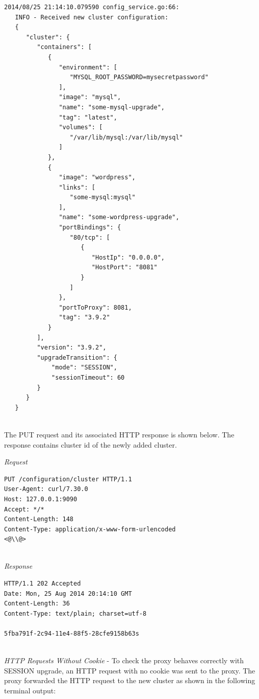 \documentclass[a4paper,11pt,twoside]{report}
\begin{document}
\begin{lstlisting}[language=terminal] 
2014/08/25 21:14:10.079590 config_service.go:66:     
   INFO - Received new cluster configuration:
   {
      "cluster": {
         "containers": [
            {
               "environment": [
                  "MYSQL_ROOT_PASSWORD=mysecretpassword"
               ],
               "image": "mysql",
               "name": "some-mysql-upgrade",
               "tag": "latest",
               "volumes": [
                  "/var/lib/mysql:/var/lib/mysql"
               ]
            },
            {
               "image": "wordpress",
               "links": [
                  "some-mysql:mysql"
               ],
               "name": "some-wordpress-upgrade",
               "portBindings": {
                  "80/tcp": [
                     {
                        "HostIp": "0.0.0.0",
                        "HostPort": "8081"
                     }
                  ]
               },
               "portToProxy": 8081,
               "tag": "3.9.2"
            }
         ],
         "version": "3.9.2",
         "upgradeTransition": {
             "mode": "SESSION",
             "sessionTimeout": 60
         }
      }
   }
\end{lstlisting}   

\noindent\\
The PUT request and its associated HTTP response is shown below. The response contains cluster id of the newly added cluster.\smallskip 

\noindent
\textit{Request}
\begin{lstlisting}[language=terminal]
PUT /configuration/cluster HTTP/1.1
User-Agent: curl/7.30.0
Host: 127.0.0.1:9090
Accept: */*
Content-Length: 148
Content-Type: application/x-www-form-urlencoded
<@\\@>
\end{lstlisting}

\noindent\\
\textit{Response}
\begin{lstlisting}[language=terminal]
HTTP/1.1 202 Accepted
Date: Mon, 25 Aug 2014 20:14:10 GMT
Content-Length: 36
Content-Type: text/plain; charset=utf-8

5fba791f-2c94-11e4-88f5-28cfe9158b63s
\end{lstlisting}  

\noindent\\
\textit{HTTP Requests Without Cookie} - To check the proxy behaves correctly with SESSION upgrade, an HTTP request with no cookie was sent to the proxy. The proxy forwarded the HTTP request to the new cluster as shown in the following terminal output: \smallskip   
\end{document}
